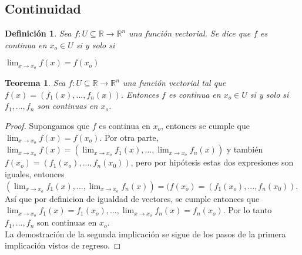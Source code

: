 \documentclass{book}
\newtheorem{theorem}{Teorema}[section]
\newtheorem{definition}{Definición}[section]
\begin{document}
\subsection{Continuidad}
\begin{definition}
Sea $f:U \subseteq \mathbb{R} \rightarrow \mathbb{R}^n$ una función vectorial. Se dice que $f$ es continua en $x_o\in U$ si y solo si
\begin{center}
       $\displaystyle \lim_{x \to x_o}f(x)=f(x_o)$
\end{center}
\end{definition}
\begin{theorem}
Sea $f:U \subseteq \mathbb{R} \rightarrow \mathbb{R}^n$ una función vectorial tal que $f(x)=(f_1(x),...,f_n(x))$. Entonces $f$ es continua en $x_o\in U$ si y solo si $f_1,...,f_n$ son continuas en $x_o$.
\end{theorem}
\begin{proof}
 Supongamos que $f$ es continua en $x_o$, entonces se cumple que $\displaystyle \lim_{x \to x_o}f(x)=f(x_o)$. Por otra parte, $\displaystyle \lim_{x \to x_o}f(x)=(\lim_{x \to x_o}f_1(x),...,\lim_{x \to x_o}f_n(x))$ y también $f(x_o)=(f_1(x_o),...,f_n(x_0))$, pero por hipótesis estas dos expresiones son iguales, entonces  $\displaystyle(\lim_{x \to x_o}f_1(x),...,\lim_{x \to x_o}f_n(x))=(f(x_o)=(f_1(x_o),...,f_n(x_0))$. Así que por definicion de igualdad de vectores, se cumple entonces que $\displaystyle \lim_{x \to x_o}f_1(x)=f_1(x_o),...,\lim_{x \to x_o}f_n(x)=f_n(x_o)$. Por lo tanto $f_1,...,f_n$ son continuas en $x_o$.
 \\[1\baselineskip]
 La demostración de la segunda implicación se sigue de los pasos de la primera implicación vistos de regreso.
\end{proof}
\end{document}
